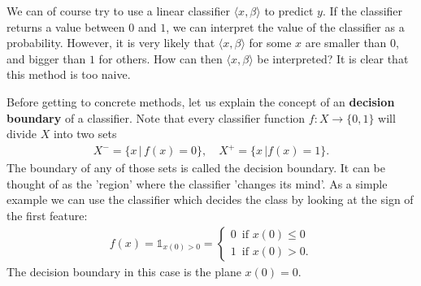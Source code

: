 \documentclass{article}
\newcommand{\sprod}[1]{\langle #1 \rangle}
\newcommand{\one}{\mathds{1}}
\begin{document}
We can of course try to use a linear classifier $\sprod{x,\beta}$ to predict $y$. If the classifier returns a value between $0$ and $1$, we can interpret the value of the classifier as a probability. However, it is very likely that $\sprod{x,\beta}$ for some $x$ are smaller than $0$, and bigger than $1$ for others. How can then $\sprod{x,\beta}$ be interpreted? It is clear that this method is too naive.

Before getting to concrete methods, let us explain the concept of an \textbf{decision boundary} of a classifier. Note that every classifier function $f: X \to \{0,1\}$ will divide $X$ into two sets
\begin{align*}
    X^-= \{x \, \vert \,  f(x)=0\} , \quad X^+= \{x \, \vert f(x)=1\}.
\end{align*}
The boundary of any of those sets is called the decision boundary. It can be thought of as the 'region' where the classifier 'changes its mind'. As a simple example we can use the classifier which decides the class by looking at the sign of the first feature:
\begin{align*}
    f(x)  = \one_{x(0)>0} =  \begin{cases}
        0 \, \text{ if } x(0)\leq 0 \\
        1 \, \text{ if } x(0)>0.
    \end{cases}
\end{align*}
The decision boundary in this case is the plane $x(0)=0$.
\end{document}
